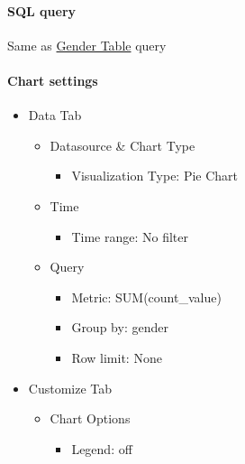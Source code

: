\documentclass[
]{book}
\providecommand{\tightlist}{%
  \setlength{\itemsep}{0pt}\setlength{\parskip}{0pt}}
\begin{document}
\hypertarget{sql-query-2}{%
\paragraph*{SQL query}\label{sql-query-2}}

Same as \protect\hyperlink{genderTableQuery}{Gender Table} query

\hypertarget{chart-settings-3}{%
\paragraph*{Chart settings}\label{chart-settings-3}}

\begin{itemize}
\tightlist
\item
  Data Tab

  \begin{itemize}
  \tightlist
  \item
    Datasource \& Chart Type

    \begin{itemize}
    \tightlist
    \item
      Visualization Type: Pie Chart
    \end{itemize}
  \item
    Time

    \begin{itemize}
    \tightlist
    \item
      Time range: No filter
    \end{itemize}
  \item
    Query

    \begin{itemize}
    \tightlist
    \item
      Metric: SUM(count\_value)
    \item
      Group by: gender
    \item
      Row limit: None
    \end{itemize}
  \end{itemize}
\item
  Customize Tab

  \begin{itemize}
  \tightlist
  \item
    Chart Options

    \begin{itemize}
    \tightlist
    \item
      Legend: off
    \end{itemize}
  \end{itemize}
\end{itemize}
\end{document}
